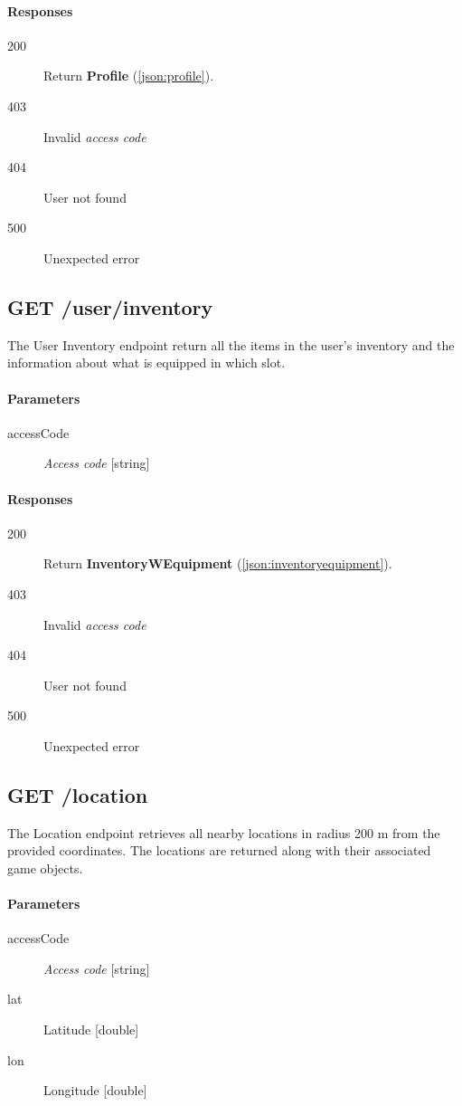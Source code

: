 		\paragraph*{Responses}
			\begin{description}
				\item[200] Return \textbf{Profile} (\ref{json:profile}).
				\item[403] Invalid \textit{access code}
				\item[404] User not found
				\item[500] Unexpected error
			\end{description}
	
	\subsection{GET /user/inventory}
	The User Inventory endpoint return all the items in the user's inventory and the information about what is equipped in which slot.
		\paragraph*{Parameters}
			\begin{description}
				\item[accessCode] \textit{Access code} [string]
			\end{description}
		\paragraph*{Responses}
			\begin{description}
				\item[200] Return \textbf{InventoryWEquipment} (\ref{json:inventoryequipment}).
				\item[403] Invalid \textit{access code}
				\item[404] User not found
				\item[500] Unexpected error
			\end{description}
		
	\subsection{GET /location}
	The Location endpoint retrieves all nearby locations in radius 200 m from the provided coordinates. The locations are returned along with their associated game objects.
		\paragraph*{Parameters}
			\begin{description}
				\item[accessCode] \textit{Access code} [string]
				\item[lat] Latitude [double]
				\item[lon] Longitude [double]
			\end{description}
